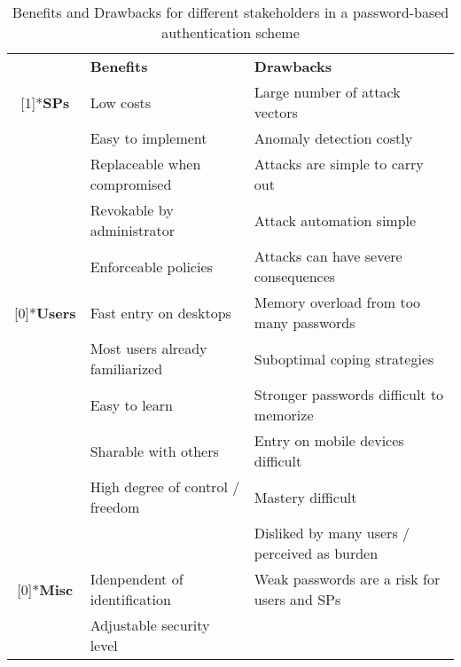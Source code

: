 \begin{table}[H]
  \centering
  \caption{\label{table:rw:benefits_drawbacks_pws}Benefits and Drawbacks for different stakeholders in a password-based authentication scheme}
    \begin{tabular}{c|lr}
	\cmidrule{2-3}    \multicolumn{1}{r}{} & \textbf{Benefits} & \multicolumn{1}{l}{\textbf{Drawbacks}} \\
	\cmidrule{2-3}    \rowcolor[rgb]{ .949,  .949,  .949} \multirow{5}[1]{*}{\textbf{SPs}} & Low costs & \multicolumn{1}{l}{Large number of attack vectors} \\
	\rowcolor[rgb]{ .949,  .949,  .949}       & Easy to implement & \multicolumn{1}{l}{Anomaly detection costly} \\
	\rowcolor[rgb]{ .949,  .949,  .949}       & Replaceable when compromised & \multicolumn{1}{l}{Attacks are simple to carry out} \\
	\rowcolor[rgb]{ .949,  .949,  .949}       & Revokable by administrator & \multicolumn{1}{l}{Attack automation simple} \\
	\rowcolor[rgb]{ .949,  .949,  .949}       & Enforceable policies & \multicolumn{1}{l}{Attacks can have severe consequences} \\
	\rowcolor[rgb]{ .886,  .937,  .855} \multirow{6}[0]{*}{\textbf{Users}} & Fast entry on desktops & \multicolumn{1}{l}{Memory overload from too many passwords} \\
	\rowcolor[rgb]{ .886,  .937,  .855}       & Most users already familiarized & \multicolumn{1}{l}{Suboptimal coping strategies} \\
	\rowcolor[rgb]{ .886,  .937,  .855}       & Easy to learn & \multicolumn{1}{l}{Stronger passwords difficult to memorize} \\
	\rowcolor[rgb]{ .886,  .937,  .855}       & Sharable with others & \multicolumn{1}{l}{Entry on mobile devices difficult} \\
	\rowcolor[rgb]{ .886,  .937,  .855}       & High degree of control / freedom & \multicolumn{1}{l}{Mastery difficult} \\
	\rowcolor[rgb]{ .886,  .937,  .855}       &       & \multicolumn{1}{l}{Disliked by many users / perceived as burden} \\
	\rowcolor[rgb]{ .851,  .882,  .949} \multirow{2}[0]{*}{\textbf{Misc}} & Idenpendent of identification & \multicolumn{1}{l}{Weak passwords are a risk for users and SPs } \\
	\rowcolor[rgb]{ .851,  .882,  .949}       & Adjustable security level &  \\
	\end{tabular}%
\end{table}%